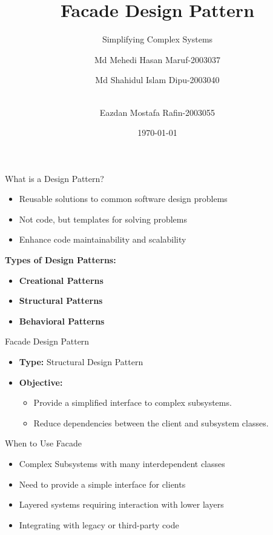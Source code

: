 \documentclass{beamer}
\title{Facade Design Pattern}
\subtitle{Simplifying Complex Systems}
\author{  
Md Mehedi Hasan Maruf-2003037  \and
Md Shahidul Islam Dipu-2003040 \and \\
Eazdan Mostafa Rafin-2003055
}
\institute{Department of Computer Science and Engineering, RUET}
\date{\today}
\begin{document}
\begin{frame}
    \titlepage
\end{frame}



\begin{frame}{What is a Design Pattern?}
    \begin{itemize}
        \item Reusable solutions to common software design problems
        \item Not code, but templates for solving problems
        \item Enhance code maintainability and scalability
    \end{itemize}
    \vspace{0.5cm}
    \textbf{Types of Design Patterns:}
    \begin{itemize}
        \item \textbf{Creational Patterns}
        \item \textbf{Structural Patterns} 
        \item \textbf{Behavioral Patterns} 
    \end{itemize}
\end{frame}


\begin{frame}{Facade Design Pattern}
    \begin{itemize}
        \item \textbf{Type:} Structural Design Pattern
        \item \textbf{Objective:}
        \begin{itemize}
            \item Provide a simplified interface to complex subsystems.
            \item Reduce dependencies between the client and subsystem classes.
        \end{itemize}
    \end{itemize}
\end{frame}



\begin{frame}{When to Use Facade}
    \begin{itemize}
        \item Complex Subsystems with many interdependent classes
        \item Need to provide a simple interface for clients
        \item Layered systems requiring interaction with lower layers
        \item Integrating with legacy or third-party code
    \end{itemize}
\end{frame}
\end{document}
